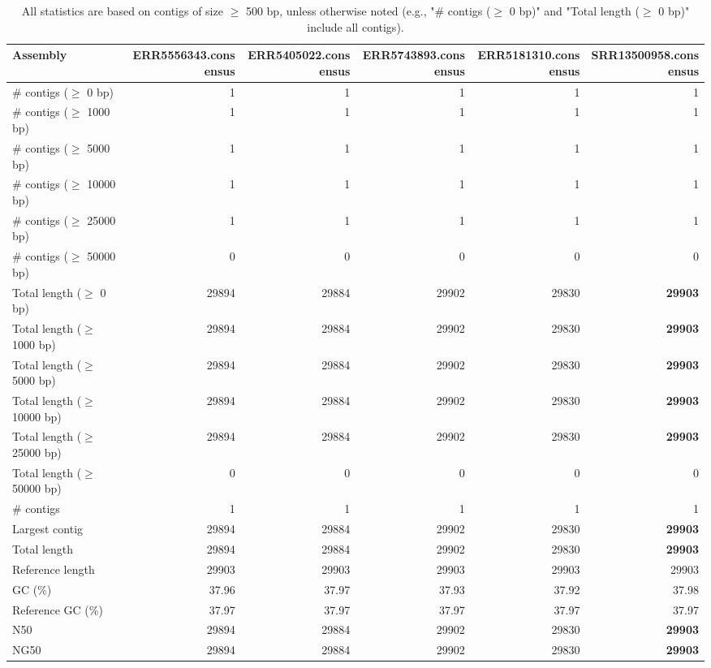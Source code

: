 \documentclass[12pt,a4paper]{article}
\begin{document}
\begin{table}[ht]
\begin{center}
\caption{All statistics are based on contigs of size $\geq$ 500 bp, unless otherwise noted (e.g., "\# contigs ($\geq$ 0 bp)" and "Total length ($\geq$ 0 bp)" include all contigs).}
\begin{tabular}{|l*{5}{|r}|}
\hline
Assembly & ERR5556343.consensus & ERR5405022.consensus & ERR5743893.consensus & ERR5181310.consensus & SRR13500958.consensus \\ \hline
\# contigs ($\geq$ 0 bp) & 1 & 1 & 1 & 1 & 1 \\ \hline
\# contigs ($\geq$ 1000 bp) & 1 & 1 & 1 & 1 & 1 \\ \hline
\# contigs ($\geq$ 5000 bp) & 1 & 1 & 1 & 1 & 1 \\ \hline
\# contigs ($\geq$ 10000 bp) & 1 & 1 & 1 & 1 & 1 \\ \hline
\# contigs ($\geq$ 25000 bp) & 1 & 1 & 1 & 1 & 1 \\ \hline
\# contigs ($\geq$ 50000 bp) & 0 & 0 & 0 & 0 & 0 \\ \hline
Total length ($\geq$ 0 bp) & 29894 & 29884 & 29902 & 29830 & {\bf 29903} \\ \hline
Total length ($\geq$ 1000 bp) & 29894 & 29884 & 29902 & 29830 & {\bf 29903} \\ \hline
Total length ($\geq$ 5000 bp) & 29894 & 29884 & 29902 & 29830 & {\bf 29903} \\ \hline
Total length ($\geq$ 10000 bp) & 29894 & 29884 & 29902 & 29830 & {\bf 29903} \\ \hline
Total length ($\geq$ 25000 bp) & 29894 & 29884 & 29902 & 29830 & {\bf 29903} \\ \hline
Total length ($\geq$ 50000 bp) & 0 & 0 & 0 & 0 & 0 \\ \hline
\# contigs & 1 & 1 & 1 & 1 & 1 \\ \hline
Largest contig & 29894 & 29884 & 29902 & 29830 & {\bf 29903} \\ \hline
Total length & 29894 & 29884 & 29902 & 29830 & {\bf 29903} \\ \hline
Reference length & 29903 & 29903 & 29903 & 29903 & 29903 \\ \hline
GC (\%) & 37.96 & 37.97 & 37.93 & 37.92 & 37.98 \\ \hline
Reference GC (\%) & 37.97 & 37.97 & 37.97 & 37.97 & 37.97 \\ \hline
N50 & 29894 & 29884 & 29902 & 29830 & {\bf 29903} \\ \hline
NG50 & 29894 & 29884 & 29902 & 29830 & {\bf 29903} \\ \hline

\end{tabular}
\end{center}
\end{table}
\end{document}
